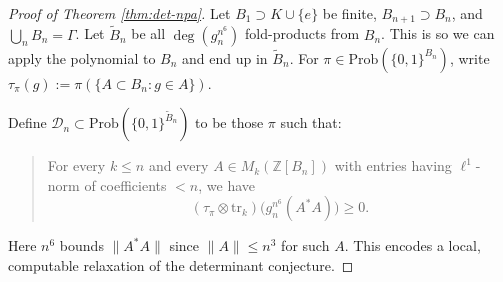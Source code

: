 \documentclass[pdflatex,sn-mathphys-num]{sn-jnl}%
\begin{document}
\begin{proof}[Proof of Theorem \ref{thm:det-npa}]
    Let $B_1 \supset K\cup\{e\}$ be finite,  
    $B_{n+1} \supset B_n$, and $\bigcup_n B_n = \Gamma$.  
    Let $\tilde{B}_n$ be all $\deg(g_n^{n^6})$ fold-products from $B_n$. This is so we can apply the polynomial to $B_n$ and end up in $\tilde{B}_n$. For $\pi \in \mathrm{Prob}(\{0,1\}^{B_n})$,  
    write $\tau_\pi(g) := \pi(\{A \subset B_n : g \in A\})$.

    Define $\mathcal{D}_n \subset \mathrm{Prob}(\{0,1\}^{\tilde{B}_n})$ to be those $\pi$ such that:
    \begin{quote}
    For every $k \leq n$ and every $A \in M_k(\mathbb{Z}[B_n])$  
    with entries having $\ell^1$-norm of coefficients $< n$, we have
    \[
        (\tau_\pi \otimes \mathrm{tr}_k) \big( g_n^{n^6}(A^*A) \big) \geq 0.
    \]
    \end{quote}
    Here $n^6$ bounds $\|A^*A\|$ since $\|A\| \leq n^3$ for such $A$.  
    This encodes a local, computable relaxation of the determinant conjecture.


\end{proof}
\end{document}
